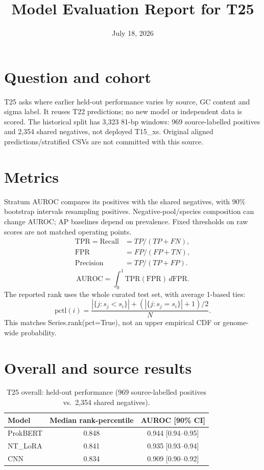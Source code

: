\documentclass{article}
\title{Model Evaluation Report for T25}
\date{July 18, 2026}
\author{}
\begin{document}
\maketitle

\section{Question and cohort}
T25 asks where earlier held-out performance varies by source, GC content and sigma label. It reuses T22 predictions; no new model or independent data is scored. The historical split has 3,323 81-bp windows: 969 source-labelled positives and 2,354 shared negatives, not deployed T15\_xs. Original aligned predictions/stratified CSVs are not committed with this source.

\section{Metrics}
Stratum AUROC compares its positives with the shared negatives, with 90\% bootstrap intervals resampling positives. Negative-pool/species composition can change AUROC; AP baselines depend on prevalence. Fixed thresholds on raw scores are not matched operating points.
\begin{align}
\mathrm{TPR}=\mathrm{Recall}&=TP/(TP+FN),\\
\mathrm{FPR}&=FP/(FP+TN),\\
\mathrm{Precision}&=TP/(TP+FP).
\end{align}
\begin{equation}
\mathrm{AUROC}=\int_0^1\mathrm{TPR}(\mathrm{FPR})\,d\mathrm{FPR}.
\end{equation}
The reported rank uses the whole curated test set, with average 1-based ties:
\begin{equation}
\mathrm{pctl}(i)=\frac{|\{j:s_j<s_i\}|+(|\{j:s_j=s_i\}|+1)/2}{N}.
\end{equation}
This matches Series.rank(pct=True), not an upper empirical CDF or genome-wide probability.

\section{Overall and source results}
\begin{table}[h]
\centering
\caption{T25 overall: held-out performance (969 source-labelled positives vs.\ 2{,}354 shared negatives).}
\begin{tabular}{lcc}
\toprule
Model & Median rank-percentile & AUROC [90\% CI] \\
\midrule
ProkBERT & 0.848 & 0.944 [0.94--0.95] \\
NT\_LoRA  & 0.841 & 0.935 [0.93--0.94] \\
CNN      & 0.834 & 0.909 [0.90--0.92] \\
\bottomrule
\end{tabular}
\end{table}
\end{document}
